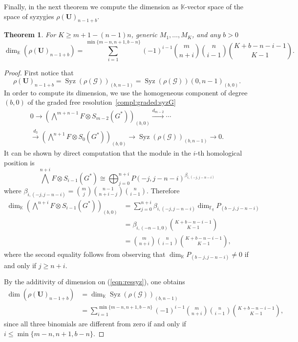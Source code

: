 \documentclass[utf8,latin1]{article}
\newtheorem{theorem}{Theorem}
\DeclareMathOperator{\Syz}{Syz}
\newcommand{\FF}{\mathbb{F}}
\newcommand{\KK}{\mathbb{K}}
\begin{document}
Finally, in the next theorem we compute the dimension as $\KK$-vector space of the space of syzygies $\rho(\mathbf{U})_{n-1+b}$.

\begin{theorem} \label{thm:dim:submax} 
For $K\geq m+1 - (n-1)n$, generic $M_1,\ldots,M_K$, and any $b>0$
$$\dim_{\KK}(\rho(\mathbf{U})_{n-1+b})=\sum_{i=1}^{\min\{m-n,n+1,b-n\}} (-1)^{i-1} \binom{m}{n+i}  \binom{n}{i-1} \binom{K + b-n -i -1}{K-1}.$$
\end{theorem}

\begin{proof}
First notice that $$\rho(\mathbf{U})_{n-1+b}=\Syz(\rho(\mathcal{G}))_{(b,n-1)}=\Syz(\rho(\mathcal{G}))(0,n-1)_{(b,0)}.$$ In order to compute its dimension, we use the homogeneous component of degree $(b,0)$ of the graded free resolution~\eqref{compl:graded:syzG}
\begin{multline}\label{eqn:ressyz}
0 \rightarrow \left(\bigwedge^{m+n-1} F \otimes S_{m-2}(G^{*})\right)_{(b,0)} \xrightarrow{d_{m-2}} \cdots \\ \xrightarrow{d_3} \left(\bigwedge^{n+1} F \otimes S_{0}(G^{*}) \right)_{(b,0)}\rightarrow\Syz(\rho(\mathcal{G}))_{(b,n-1)}\rightarrow 0.
\end{multline}
It can be shown by direct computation that the module in the $i$-th homological position is $$\bigwedge^{n+i} F \otimes S_{i-1}(G^{*})\cong \bigoplus_{j=0}^{n+i}P(-j,j-n-i)^{\beta_{i,(-j,j-n-i)}}$$
where $\beta_{i,(-j,j-n-i)}={m\choose j}{n-1\choose n+i-j}{n\choose i-1}.$ Therefore
\begin{align*}
\dim_{\KK}\left(\bigwedge^{n+i} F \otimes S_{i-1}(G^{*})\right)_{(b,0)} &=\sum_{j=0}^{n+i} \beta_{i,(-j,j-n-i)} \dim_{\FF_q} P_{(b-j,j-n-i)} \\
&= \beta_{i,(-n-1,0)} \binom{K + b -n -i -1}{K-1} \\
&= \binom{m}{n+i}  \binom{n}{i-1} \binom{K + b-n -i -1}{K-1},
\end{align*}
where the second equality follows from observing that $\dim_{\KK} P_{(b-j,j-n-i)} \neq 0$ if and only if $j \geq n+i$.  

By the additivity of dimension on (\ref{eqn:ressyz}), one obtains
\begin{align*}
\dim(\rho(\mathbf{U})_{n-1+b}) & =
\dim_{\KK}\Syz(\rho(\mathcal{G}))_{(b,n-1)} \\ & =\sum_{i=1}^{\min\{m-n,n+1,b-n\}} (-1)^{i-1} \binom{m}{n+i}  \binom{n}{i-1} \binom{K + b-n -i -1}{K-1},
\end{align*}
since all three binomials are different from zero if and only if $i \leq \min\{m-n, n+1, b-n\}$. 
\end{proof}
\end{document}
